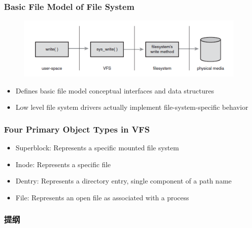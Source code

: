 \begin{frame}[fragile]
    \frametitle{Basic File Model of File System}

% 
  \begin{figure}
    \centering
    \includegraphics[width=0.8\linewidth]{figs/vfs-Basic-File-Model.png}
	\end{figure}



    \begin{itemize}
        \item Defines basic file model conceptual interfaces and data structures
        \item Low level file system drivers actually implement file-system-specific behavior
    \end{itemize}
% 
\end{frame}
\begin{frame}[fragile]
    \frametitle{Four Primary Object Types in VFS}


    \begin{itemize}
        \item Superblock: Represents a specific mounted file system
        \item Inode: Represents a specific file
        \item Dentry: Represents a directory entry, single component of a path name
        \item File: Represents an open file as associated with a process
    \end{itemize}
% 
\end{frame}
\begin{frame}
\frametitle{提纲} %
\tableofcontents %
\end{frame}
